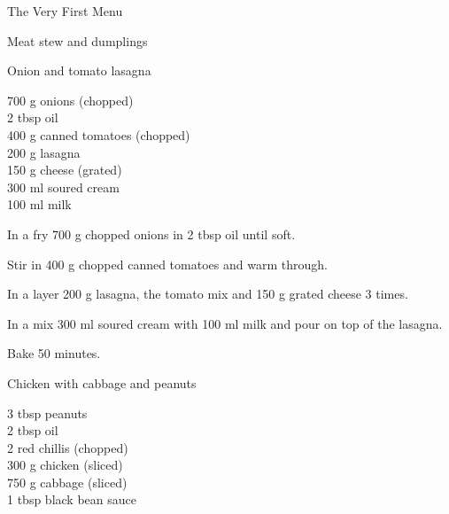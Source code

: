 \begin{menu}{The Very First Menu}
\begin{recipe}{2}{Meat stew and dumplings}
\begin{instructions}
    \end{instructions}
    \end{recipe}%
  
    \begin{recipe}{2}{Onion and tomato lasagna}%
    
		\begin{ingredients}
		700 g onions (chopped) \\
	2 tbsp oil  \\
	400 g canned tomatoes (chopped) \\
	200 g lasagna  \\
	150 g cheese (grated) \\
	300 ml soured cream  \\
	100 ml milk  \\
	
		\end{ingredients}
	
    \begin{instructions}
    \item 
				In a  fry
				700 g chopped onions
				in
				2 tbsp  oil
				until soft.
			\item 
				Stir in 400 g chopped canned tomatoes
				and warm through.
			\item 
				In a  layer
				200 g  lasagna,
				the tomato mix and
				150 g grated cheese
				3 times.
			\item 
				In a  mix
				300 ml  soured cream
				with
				100 ml  milk
				and pour on top of the lasagna.
			\item 
				Bake  50 minutes.
			
    \end{instructions}
    \end{recipe}%
  
    \begin{recipe}{2}{Chicken with cabbage and peanuts}%
    
		\begin{ingredients}
		3 tbsp peanuts  \\
	2 tbsp oil  \\
	2  red chillis (chopped) \\
	300 g chicken (sliced) \\
	750 g cabbage (sliced) \\
	1 tbsp black bean sauce  \\
	
		\end{ingredients}
	

\end{recipe}
\end{menu}
